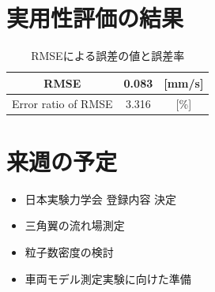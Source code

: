 \documentclass[twocolumn,a4j]{jsarticle}
\begin{document}
\section{実用性評価の結果}
\begin{table}[hbtp]
  \label{table:data_type}
  \caption{RMSEによる誤差の値と誤差率}
  \centering
  \begin{tabular}{ c | c c }
    \hline
    RMSE                & 0.083 & [mm/s] \\ \hline
    Error ratio of RMSE & 3.316 & [\%]   \\ \hline
  \end{tabular}
\end{table}

\section{来週の予定}
\begin{itemize}
  \item 日本実験力学会 登録内容 決定
  \item 三角翼の流れ場測定
  \item 粒子数密度の検討
  \item 車両モデル測定実験に向けた準備
\end{itemize}
\end{document}
